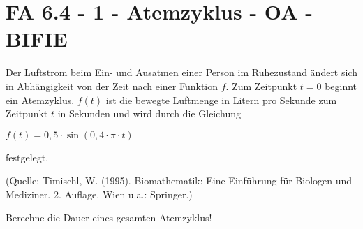 \section{FA 6.4 - 1 - Atemzyklus - OA - BIFIE}

\begin{beispiel}[FA 6.4]{1} %
				Der Luftstrom beim Ein- und Ausatmen einer Person im Ruhezustand ändert sich in Abhängigkeit von der Zeit nach einer Funktion $f$. Zum Zeitpunkt $t=0$ beginnt ein Atemzyklus. $f(t)$ ist die bewegte Luftmenge in Litern pro Sekunde zum Zeitpunkt $t$ in Sekunden und wird durch die Gleichung \begin{center}$f(t)=0,5\cdot\sin(0,4\cdot\pi\cdot t)$\end{center} festgelegt.

\begin{tiny} (Quelle: Timischl, W. (1995). Biomathematik: Eine Einführung für Biologen und Mediziner. 2. Auflage. Wien u.a.: Springer.)\end{tiny}

Berechne die Dauer eines gesamten Atemzyklus!

\end{beispiel}